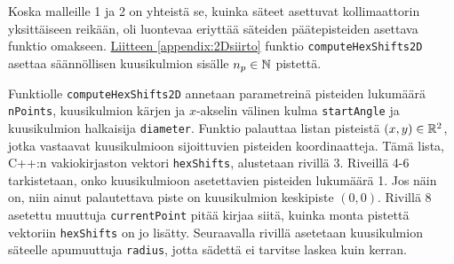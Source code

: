 
Koska malleille 1 ja 2 on yhteistä se, kuinka säteet asettuvat kollimaattorin yksittäiseen reikään, oli luontevaa eriyttää säteiden päätepisteiden asettava funktio omakseen. \hyperref[appendix:2Dsiirto]{Liitteen \ref*{appendix:2Dsiirto}} funktio \texttt{computeHexShifts2D} asettaa säännöllisen kuusikulmion sisälle $n_p\in\mathbb{N}$ pistettä.

Funktiolle \texttt{computeHexShifts2D} annetaan parametreinä pisteiden lukumäärä \texttt{nPoints}, kuusikulmion kärjen ja $x$-akselin välinen kulma \texttt{startAngle} ja kuusikulmion halkaisija \texttt{diameter}. Funktio palauttaa listan pisteistä $(x, y)\in\mathbb{R}^2$, jotka vastaavat kuusikulmioon sijoittuvien pisteiden koordinaatteja. Tämä lista, C++:n vakiokirjaston vektori \texttt{hexShifts}, alustetaan rivillä 3. Riveillä 4-6 tarkistetaan, onko kuusikulmioon asetettavien pisteiden lukumäärä 1. Jos näin on, niin ainut palautettava piste on kuusikulmion keskipiste $(0, 0)$. Rivillä 8 asetettu muuttuja \texttt{currentPoint} pitää kirjaa siitä, kuinka monta pistettä vektoriin \texttt{hexShifts} on jo lisätty. Seuraavalla rivillä asetetaan kuusikulmion säteelle apumuuttuja \texttt{radius}, jotta sädettä ei tarvitse laskea kuin kerran.

